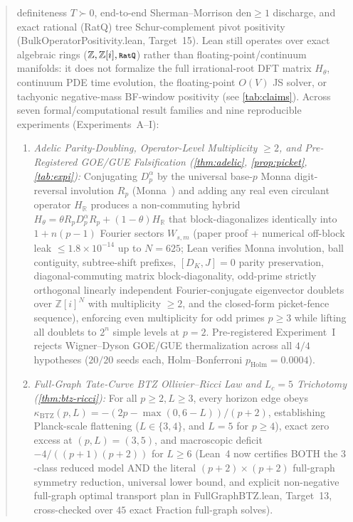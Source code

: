 \documentclass[11pt,a4paper]{article}
\numberwithin{equation}{section}
\theoremstyle{plain}
\theoremstyle{definition}
\theoremstyle{remark}
\newcommand{\Z}{\mathbb{Z}}
\newcommand{\R}{\mathbb{R}}
\newcommand{\Dp}{D_p^\alpha}
\newcommand{\code}[1]{{\ttfamily\footnotesize\def\_{\textunderscore\penalty0\hskip0pt}#1}}
\begin{document}
\begin{abstract}
definiteness $T \succ 0$, end-to-end Sherman--Morrison $\mathrm{den} \ge 1$ discharge, and exact rational (\code{RatQ}) tree Schur-complement pivot positivity (\code{BulkOperatorPositivity.lean}, Target~15). Lean still operates over exact algebraic rings ($\Z, \Z[i], \text{\code{RatQ}}$) rather than floating-point/continuum manifolds: it does not formalize the full irrational-root DFT matrix $H_\theta$, continuum PDE time evolution, the floating-point $O(V)$ JS solver, or tachyonic negative-mass BF-window positivity (see \cref{tab:claims}). Across seven formal/computational result families and nine reproducible experiments (Experiments~A--I):
\begin{enumerate}[leftmargin=1.8em,itemsep=2pt]
  \item \emph{Adelic Parity-Doubling, Operator-Level Multiplicity $\ge 2$, and Pre-Registered GOE/GUE Falsification (\cref{thm:adelic}, \cref{prop:picket}, \cref{tab:expi}):} Conjugating $\Dp$ by the universal base-$p$ Monna digit-reversal involution $R_p$ (Monna~\cite{Monna1970}) and adding any real even circulant operator $H_{\R}$ produces a non-commuting hybrid $H_\theta = \theta R_p \Dp R_p + (1-\theta) H_{\R}$ that block-diagonalizes identically into $1 + n(p-1)$ Fourier sectors $W_{s,m}$ (paper proof + numerical off-block leak $\le 1.8\times 10^{-14}$ up to $N = 625$; Lean verifies Monna involution, ball contiguity, subtree-shift prefixes, $[D_K, J] = 0$ parity preservation, diagonal-commuting matrix block-diagonality, odd-prime strictly orthogonal linearly independent Fourier-conjugate eigenvector doublets over $\Z[i]^N$ with multiplicity $\ge 2$, and the closed-form picket-fence sequence), enforcing even multiplicity for odd primes $p \ge 3$ while lifting all doublets to $2^n$ simple levels at $p = 2$. Pre-registered Experiment~I rejects Wigner--Dyson GOE/GUE thermalization across all $4/4$ hypotheses ($20/20$ seeds each, Holm--Bonferroni $p_{\mathrm{Holm}} = 0.0004$).
  \item \emph{Full-Graph Tate-Curve BTZ Ollivier--Ricci Law and $L_c = 5$ Trichotomy (\cref{thm:btz-ricci}):} For all $p \ge 2, L \ge 3$, every horizon edge obeys $\kappa_{\mathrm{BTZ}}(p, L) = -(2p - \max(0, 6-L))/(p+2)$, establishing Planck-scale flattening ($L \in \{3,4\}$, and $L=5$ for $p \ge 4$), exact zero excess at $(p, L) = (3, 5)$, and macroscopic deficit $-4/((p+1)(p+2))$ for $L \ge 6$ (Lean~4 now certifies BOTH the $3$-class reduced model AND the literal $(p+2)\times(p+2)$ full-graph symmetry reduction, universal lower bound, and explicit non-negative full-graph optimal transport plan in \code{FullGraphBTZ.lean}, Target~13, cross-checked over $45$ exact \code{Fraction} full-graph solves).

\end{enumerate}
\end{abstract}
\end{document}
